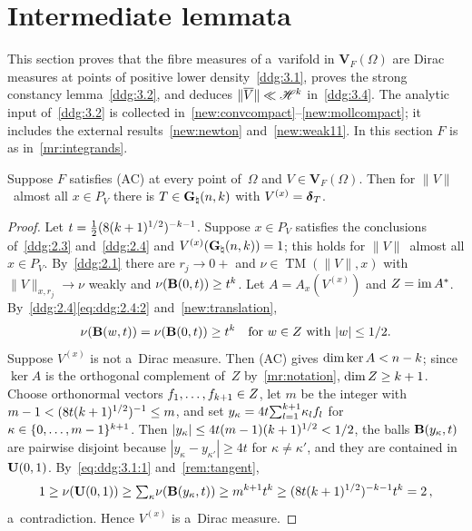 \documentclass[a4paper,twoside,leqno]{article}
\newcommand{\Gk}{\pgrass{\adim}{\vdim}}        %
\DeclareMathOperator{\TM}{TM}                   %
\begin{document}
\section{Intermediate lemmata}
\label{sec:intermediate}

\begin{miniremark}
    \label{mr:intermediate}
    This section proves that the fibre measures of a~varifold in $\mathbf{V}_F(\Omega)$ are
    Dirac measures at points of positive lower density~\ref{ddg:3.1}, proves the strong constancy
    lemma~\ref{ddg:3.2}, and deduces $\|\overline V\| \ll \mathscr{H}^{k}$ in~\ref{ddg:3.4}. The
    analytic input of~\ref{ddg:3.2} is collected in~\ref{new:convcompact}--\ref{new:mollcompact};
    it includes the external results~\ref{new:newton} and~\ref{new:weak11}. In this section $F$ is
    as in~\ref{mr:integrands}.
\end{miniremark}

\begin{lemma}
    \label{ddg:3.1}
    Suppose $F$ satisfies (AC) at every point of~$\Omega$ and $V \in \mathbf{V}_F(\Omega)$. Then
    for $\|V\|$~almost all $x \in P_V$ there is $T \in \Gk$ with $V^{(x)} = \boldsymbol{\delta}_{T}$.
\end{lemma}

\begin{proof}
    Let $t = \frac 12 (8 (k + 1)^{1/2})^{-k - 1}$. Suppose $x \in P_V$ satisfies the
    conclusions of~\ref{ddg:2.3} and~\ref{ddg:2.4} and $V^{(x)}(\Gk) = 1$; this holds for
    $\|V\|$~almost all $x \in P_V$. By~\ref{ddg:2.1} there are $r_j \to 0+$ and $\nu \in
    \TM(\|V\|,x)$ with $\|V\|_{x,r_j} \to \nu$ weakly and $\nu(\mathbf{B}(0,t)) \ge t^{k}$.
    Let $A = A_x(V^{(x)})$ and $Z = \operatorname{im} A^{*}$. By~\ref{ddg:2.4}\eqref{eq:ddg:2.4:2}
    and~\ref{new:translation},
    \begin{equation}
        \label{eq:ddg:3.1:1}
        \nu(\mathbf{B}(w,t)) = \nu(\mathbf{B}(0,t)) \ge t^{k} \quad \text{for $w \in Z$ with $|w| \le
        1/2$}.
    \end{equation}
    Suppose $V^{(x)}$ is not a~Dirac measure. Then (AC) gives $\dim \ker A < n - k$;
    since $\ker A$ is the orthogonal complement of~$Z$ by~\ref{mr:notation}, $\dim Z \ge k + 1$.
    Choose orthonormal vectors $f_1, \ldots, f_{k+1} \in Z$, let $m$ be the integer with $m - 1
    < (8 t (k+1)^{1/2})^{-1} \le m$, and set $y_\kappa = 4t {\textstyle\sum_{l=1}^{k+1}} \kappa_l f_l$
    for $\kappa \in \{0, \ldots, m-1\}^{k+1}$. Then $|y_\kappa| \le 4t(m-1)(k+1)^{1/2} <
    1/2$, the balls $\mathbf{B}(y_\kappa,t)$ are pairwise disjoint because $|y_\kappa - y_{\kappa'}|
    \ge 4t$ for $\kappa \ne \kappa'$, and they are contained in~$\mathbf{U}(0,1)$. By~\eqref{eq:ddg:3.1:1}
    and~\ref{rem:tangent},
    \begin{displaymath}
        1 \ge \nu(\mathbf{U}(0,1)) \ge {\textstyle\sum_{\kappa}^{}} \nu(\mathbf{B}(y_\kappa,t)) \ge m^{k+1}
        t^{k} \ge (8 t (k+1)^{1/2})^{-k-1} t^{k} = 2 \,,
    \end{displaymath}
    a~contradiction. Hence $V^{(x)}$ is a~Dirac measure.
\end{proof}
\end{document}
